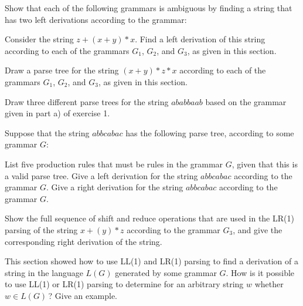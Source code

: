 \begin{exercises}

\problem Show that each of the following grammars is ambiguous by finding
a string that has two left derivations according to the grammar:

\problem Consider the string $z+(x+y)*x$.  Find a left derivation
of this string according to each of the grammars $G_1$, $G_2$, and
$G_3$, as given in this section.

\problem Draw a parse tree for the string $(x+y)*z*x$ according to
each of the grammars $G_1$, $G_2$, and $G_3$, as given in this section.

\problem Draw three different parse trees for the string
$ababbaab$ based on the grammar given in part a) of exercise 1.

\problem Suppose that the string $abbcabac$ has the following parse
tree, according to some grammar $G$:

\centerline{}
\medskip

\ppart List five production rules that must be rules in the grammar $G$,
given that this is a valid parse tree.
\ppart Give a left derivation for the string $abbcabac$ according to the
grammar $G$.
\ppart Give a right derivation for the string $abbcabac$ according to the
grammar $G$.

\problem Show the full sequence of shift and reduce operations
that are used in the LR(1) parsing of the string $x+(y)*z$ according
to the grammar $G_3$, and give the corresponding right derivation
of the string.

\problem This section showed how to use LL(1) and LR(1) parsing to
find a derivation of a string in the language $L(G)$ generated by
some grammar $G$.  How is it possible to use LL(1) or LR(1) parsing
to determine for an arbitrary string $w$ whether $w\in L(G)\,$?
Give an example.

\end{exercises}



